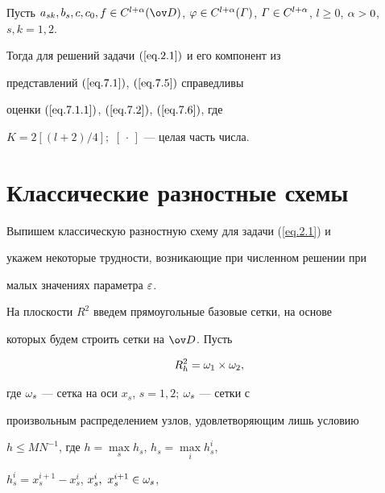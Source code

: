 \begin{thms}\label{t7.1}


Пусть $a_{sk}, b_s, c, c_0, f\in C^{l+\al}(\od)$, $\vp\in


C^{l+\al}(\varGamma)$, $\varGamma\in C^{l+\al}$, $l\geq0$, $\al>0$, $s,k=1,2$.


Тогда для решений задачи $(\ref{eq.2.1})$ и его компонент из


представлений $(\ref{eq.7.1})$, $(\ref{eq.7.5})$ справедливы


оценки $(\ref{eq.7.1.1})$, $(\ref{eq.7.2})$, $(\ref{eq.7.6})$, где


$K=2[(l+2)/4];$ $[\,\cdot\,]$ --- целая часть числа.


\end{thms}








\section{Классические разностные схемы}


\label{section.3}





Выпишем классическую разностную схему для задачи (\ref{eq.2.1}) и


укажем некоторые трудности, возникающие при численном решении при


малых значениях параметра $\varepsilon$.





На плоскости $R^2$ введем прямоугольные базовые сетки, на основе


которых будем строить сетки на $\od$. Пусть


\begin{equation}\label{eq.3.1}


R_h^2=\om_1\times\om_2,


\end{equation}


где $\omega_s$ --- сетка на оси $x_s$, $s=1,2$; $\omega_s$ --- сетки с


произвольным распределением узлов, удовлетворяющим лишь условию


$h\leq MN^{-1}$, где $h=\max\limits_s h_s$, $h_s=\max\limits_i h_s^i$,


$h_s^i=x_s^{i+1}-x_s^i$, $x_s^i,~x_s^{i+1}\in\omega_s$,


